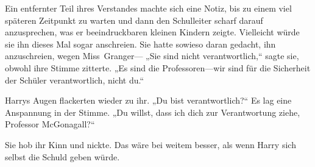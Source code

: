 
Ein entfernter Teil ihres Verstandes machte sich eine Notiz, bis zu einem viel späteren Zeitpunkt zu warten und dann den Schulleiter scharf darauf anzusprechen, was er beeindruckbaren kleinen Kindern zeigte. Vielleicht würde sie ihn dieses Mal sogar anschreien. Sie hatte sowieso daran gedacht, ihn anzuschreien, wegen Miss~Granger—
„Sie sind nicht verantwortlich,“ sagte sie, obwohl ihre Stimme zitterte. „Es sind die Professoren—wir sind für die Sicherheit der Schüler verantwortlich, nicht du.“

Harrys Augen flackerten wieder zu ihr. „Du bist verantwortlich?“ Es lag eine Anspannung in der Stimme. „Du willst, dass ich dich zur Verantwortung ziehe, Professor McGonagall?“

Sie hob ihr Kinn und nickte. Das wäre bei weitem besser, als wenn Harry sich selbst die Schuld geben würde.

